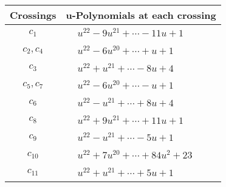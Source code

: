 \documentclass[1p]{elsarticle_modified}
\theoremstyle{definition}
\begin{document}
\begin{tabular}{m{50pt}|m{274pt}}
Crossings & \hspace{64pt}u-Polynomials at each crossing \\
\hline $$\begin{aligned}c_{1}\end{aligned}$$&$\begin{aligned}
&u^{22}-9 u^{21}+\cdots-11 u+1
\end{aligned}$\\
\hline $$\begin{aligned}c_{2},c_{4}\end{aligned}$$&$\begin{aligned}
&u^{22}-6 u^{20}+\cdots+u+1
\end{aligned}$\\
\hline $$\begin{aligned}c_{3}\end{aligned}$$&$\begin{aligned}
&u^{22}+u^{21}+\cdots-8 u+4
\end{aligned}$\\
\hline $$\begin{aligned}c_{5},c_{7}\end{aligned}$$&$\begin{aligned}
&u^{22}-6 u^{20}+\cdots- u+1
\end{aligned}$\\
\hline $$\begin{aligned}c_{6}\end{aligned}$$&$\begin{aligned}
&u^{22}- u^{21}+\cdots+8 u+4
\end{aligned}$\\
\hline $$\begin{aligned}c_{8}\end{aligned}$$&$\begin{aligned}
&u^{22}+9 u^{21}+\cdots+11 u+1
\end{aligned}$\\
\hline $$\begin{aligned}c_{9}\end{aligned}$$&$\begin{aligned}
&u^{22}- u^{21}+\cdots-5 u+1
\end{aligned}$\\
\hline $$\begin{aligned}c_{10}\end{aligned}$$&$\begin{aligned}
&u^{22}+7 u^{20}+\cdots+84 u^2+23
\end{aligned}$\\
\hline $$\begin{aligned}c_{11}\end{aligned}$$&$\begin{aligned}
&u^{22}+u^{21}+\cdots+5 u+1
\end{aligned}$\\
\hline
\end{tabular}\\~\\
\end{document}
